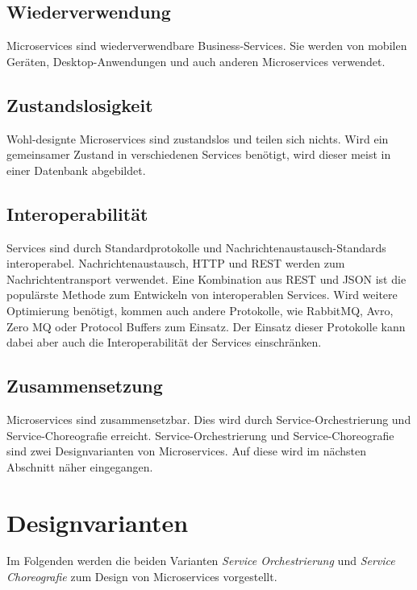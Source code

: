 \subsection{Wiederverwendung}
Microservices sind wiederverwendbare Business-Services. Sie werden von mobilen Geräten, Desktop-Anwendungen und auch anderen Microservices verwendet.

\subsection{Zustandslosigkeit}
Wohl-designte Microservices sind zustandslos und teilen sich nichts. Wird ein gemeinsamer Zustand in verschiedenen Services benötigt, wird dieser meist in einer Datenbank abgebildet.

\subsection{Interoperabilität}
Services sind durch Standardprotokolle und Nachrichtenaustausch-Standards interoperabel. Nachrichtenaustausch, HTTP und REST werden zum Nachrichtentransport verwendet. Eine Kombination aus REST und JSON ist die populärste Methode zum Entwickeln von interoperablen Services. Wird weitere Optimierung benötigt, kommen auch andere Protokolle, wie RabbitMQ, Avro, Zero MQ oder Protocol Buffers zum Einsatz. Der Einsatz dieser Protokolle kann dabei aber auch die Interoperabilität der Services einschränken.

\subsection{Zusammensetzung}
Microservices sind zusammensetzbar. Dies wird durch Service-Orchestrierung und Service-Choreografie erreicht. Service-Orchestrierung und Service-Choreografie sind zwei Designvarianten von Microservices. Auf diese wird im nächsten Abschnitt näher eingegangen.

\section{Designvarianten}
Im Folgenden werden die beiden Varianten \textit{Service Orchestrierung} und \textit{Service Choreografie} zum Design von Microservices vorgestellt.

